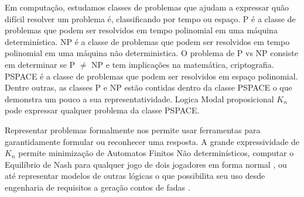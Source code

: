 



Em computação, estudamos classes de problemas que ajudam a expressar quão difícil resolver um problema é, classificando por tempo ou espaço. P é a classe de problemas que podem ser resolvidos em tempo polinomial em uma máquina determinística. NP é a classe de problemas que podem ser resolvidos em tempo polinomial em uma máquina não deterministica. O problema de P vs NP consiste em determinar se P $\not=$ NP e tem implicações na matemática, criptografia. PSPACE é a classe de problemas que podem ser resolvidos em espaço polinomial. Dentre outras, as classes P e NP estão contidas dentro da classe PSPACE o que demonstra um pouco a sua representatividade. %
Logica Modal proposicional $K_n$ pode expressar qualquer problema da classe PSPACE. %

Representar problemas formalmente nos permite usar ferramentas para garantidamente formular ou reconhecer uma resposta.
A grande expressividade de $K_n$ permite minimização de Automatos Finitos Não determinísticos\cite{nfahard}, computar o Equilíbrio de Nash para qualquer jogo de dois jogadores em forma normal \cite{nashpspace}, ou até representar modelos de outras lógicas \cite{correspkn} o que possibilita seu uso desde engenharia de requisitos \cite{reqeng} a geração contos de fadas \cite{fairytale}.

